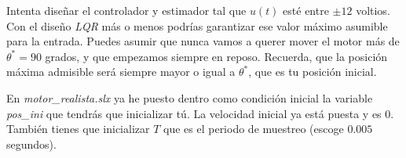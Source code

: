 \documentclass[11pt,a4paper,titlepage]{article}
\begin{document}
	Intenta diseñar el controlador y estimador tal que $u(t)$ esté entre $\pm 12$ voltios. Con el diseño \emph{LQR} más o menos podrías garantizar ese valor máximo asumible para la entrada. Puedes asumir que nunca vamos a querer mover el motor más de $\theta^* = 90$ grados, y que empezamos siempre en reposo. Recuerda, que la posición máxima admisible será siempre mayor o igual a $\theta^*$, que es tu posición inicial.

En \emph{motor\_realista.slx} ya he puesto dentro como condición inicial la variable \emph{pos\_ini} que tendrás que inicializar tú. La velocidad inicial ya está puesta y es $0$. También tienes que inicializar $T$ que es el periodo de muestreo (escoge $0.005$ segundos).
\end{document}
